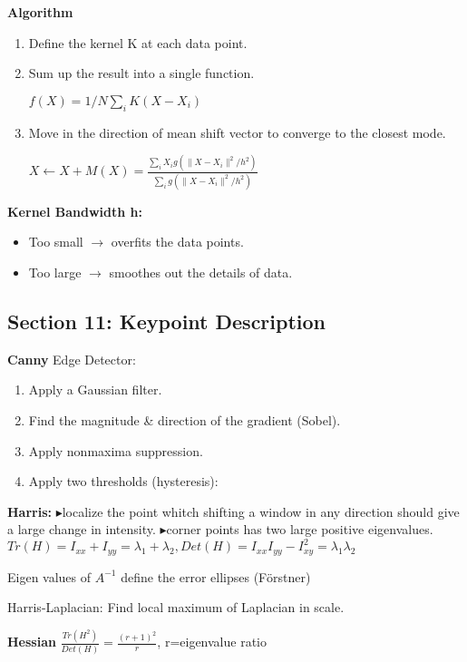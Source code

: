 \documentclass{../cheat}
\def \itm{{\tiny$\blacktriangleright$}}
\begin{document}
\begin{multicols}{3}
	\textbf{Algorithm}
	\begin{enumerate}[nolistsep, leftmargin=1em]
		\item Define the kernel K at each data point.
		\item Sum up the result into a single function.\\
			\centerline{$f(X)=1/N \sum_i K(X-X_i)$}
		\item Move in the direction of mean shift vector to converge to the closest mode.\\
			\centerline{$X \leftarrow X+M(X)=\frac{\sum_i X_i g(\parallel X-X_i \parallel^2/h^2)}
			{\sum_i g(\parallel X-X_i \parallel^2/h^2)}$}
	\end{enumerate}
	
	\textbf{Kernel Bandwidth h:}
	\begin{itemize}[nolistsep, leftmargin=1em]
		\item Too small $\rightarrow$ overfits the data points.
		\item Too large $\rightarrow$ smoothes out the details of data. 
	\end{itemize}
	
	\subsection{Section 11: Keypoint Description}
		\textbf{Canny} Edge Detector:
		\begin{enumerate}[label=\roman*, nolistsep, leftmargin=1em]
			\item Apply a Gaussian filter.
			\item Find the magnitude \& direction of the gradient (Sobel).
			\item Apply nonmaxima suppression.
			\item Apply two thresholds (hysteresis):
		\end{enumerate}
		
		\textbf{Harris:}
		\itm localize the point whitch shifting a window in any direction should give a large change in intensity.  
		\itm corner points has two large positive eigenvalues.
		$Tr(H)=I_{xx}+I_{yy}=\lambda_1+\lambda_2, Det(H)=I_{xx}I_{yy}-I_{xy}^2=\lambda_1 \lambda_2$
		
		Eigen values of $A^{-1}$ define the error ellipses (F\"{o}rstner)
		
		Harris-Laplacian: Find local maximum of Laplacian in scale.
		
		\textbf{Hessian} $\frac{Tr(H^2)}{Det(H)}=\frac{(r+1)^2}{r}$, r=eigenvalue ratio
		

\end{multicols}
\end{document}

